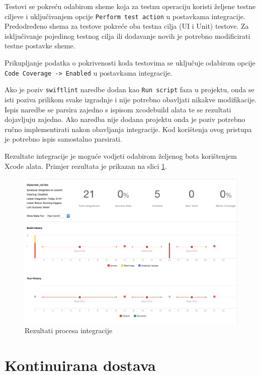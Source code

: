 \documentclass[times, utf8, diplomski, numeric]{fer}
\begin{document}
\begin{appendices}
Testovi se pokreću odabirom sheme koja za testnu operaciju koristi željene testne ciljeve i uključivanjem opcije \verb|Perform test action| u postavkama integracije. Predodređeno shema za testove pokreće oba testna cilja (UI i Unit) testove. Za isključivanje pojedinog testnog cilja ili dodavanje novih je potrebno modificirati testne postavke sheme.

Prikupljanje podatka o pokrivenosti koda testovima se uključuje odabirom opcije \verb|Code Coverage -> Enabled| u postavkama integracije.

Ako je poziv \verb|swiftlint| naredbe dodan kao \verb|Run script| faza u projektu, onda se isti poziva prilikom svake izgradnje i nije potrebno obavljati nikakve modifikacije. Ispis naredbe se parsira zajedno s ispisom xcodebuild alata te se rezultati dojavljuju zajedno. Ako naredba nije dodana projektu onda je poziv potrebno ručno implementirati nakon obavljanja integracije. Kod korištenja ovog pristupa je potrebno ispis samostalno parsirati.

Rezultate integracije je moguće vodjeti odabirom željenog bota korištenjem Xcode alata. Primjer rezultata je prikazan na slici \ref{fig:XcodeServerResult}.

\begin{figure}
    \centering
    \includegraphics[scale=0.4]{XcodeServerResult}
    \caption{Rezultati procesa integracije}
    \label{fig:XcodeServerResult}
\end{figure}

\section{Kontinuirana dostava} \label{header:KontinuiranaDostavaAutomatizacija}




\end{appendices}
\end{document}
